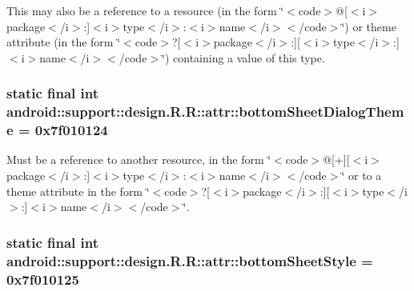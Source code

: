 This may also be a reference to a resource (in the form \char`\"{}$<$code$>$@\mbox{[}$<$i$>$package$<$/i$>$:\mbox{]}$<$i$>$type$<$/i$>$:$<$i$>$name$<$/i$>$$<$/code$>$\char`\"{}) or theme attribute (in the form \char`\"{}$<$code$>$?\mbox{[}$<$i$>$package$<$/i$>$:\mbox{]}\mbox{[}$<$i$>$type$<$/i$>$:\mbox{]}$<$i$>$name$<$/i$>$$<$/code$>$\char`\"{}) containing a value of this type. \hypertarget{classandroid_1_1support_1_1design_1_1_r_1_1attr_62e425e97dc267026ae6ad7feecc650c}{
\subsubsection[{bottomSheetDialogTheme}]{\setlength{\rightskip}{0pt plus 5cm}static final int android::support::design.R.R::attr::bottomSheetDialogTheme = 0x7f010124}}
\label{classandroid_1_1support_1_1design_1_1_r_1_1attr_62e425e97dc267026ae6ad7feecc650c}


Must be a reference to another resource, in the form \char`\"{}$<$code$>$@\mbox{[}+\mbox{]}\mbox{[}$<$i$>$package$<$/i$>$:\mbox{]}$<$i$>$type$<$/i$>$:$<$i$>$name$<$/i$>$$<$/code$>$\char`\"{} or to a theme attribute in the form \char`\"{}$<$code$>$?\mbox{[}$<$i$>$package$<$/i$>$:\mbox{]}\mbox{[}$<$i$>$type$<$/i$>$:\mbox{]}$<$i$>$name$<$/i$>$$<$/code$>$\char`\"{}. \hypertarget{classandroid_1_1support_1_1design_1_1_r_1_1attr_a1ad81d99ae270cfeba87091de6cd042}{
\subsubsection[{bottomSheetStyle}]{\setlength{\rightskip}{0pt plus 5cm}static final int android::support::design.R.R::attr::bottomSheetStyle = 0x7f010125}}
\label{classandroid_1_1support_1_1design_1_1_r_1_1attr_a1ad81d99ae270cfeba87091de6cd042}


